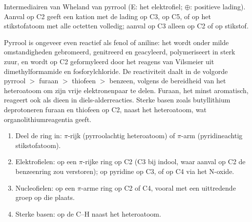 \begin{omfigure}

{\small Intermediairen van Wheland van pyrrool (E: het elektrofiel; $\oplus$: positieve lading).
Aanval op C2 geeft een kation met de lading op C3, op C5, of op het stikstofatoom met alle
octetten volledig; aanval op C3 alleen op C2 of op stikstof.}
\end{omfigure}

Pyrrool is ongeveer even reactief als fenol of aniline: het wordt onder
milde omstandigheden gebromeerd, genitreerd en geacyleerd, polymeriseert
in sterk zuur, en wordt op C2 geformyleerd door het reagens van Vilsmeier
uit dimethylformamide en fosforylchloride. De reactiviteit daalt in de volgorde pyrrool $>$ furaan $>$ thiofeen $>$ benzeen,
volgens de bereidheid van het heteroatoom om zijn vrije elektronenpaar te
delen. Furaan, het minst aromatisch, reageert ook als dieen in
diels-alderreacties. Sterke basen zoals butyllithium deprotoneren furaan
en thiofeen op C2, naast het heteroatoom, wat
organolithiumreagentia geeft.

\begin{method}\label{met:b3:heterocycles:site}
\begin{enumerate}
  \item Deel de ring in: $\pi$-rijk (pyrroolachtig heteroatoom) of $\pi$-arm
        (pyridineachtig stikstofatoom).
  \item Elektrofielen: op een $\pi$-rijke ring op C2 (C3 bij indool, waar aanval op C2
        de benzeenring zou verstoren); op pyridine op C3, of op C4 via het
        N-oxide.
  \item Nucleofielen: op een $\pi$-arme ring op C2 of C4, vooral met een
        uittredende groep op die plaats.
  \item Sterke basen: op de C--H naast het heteroatoom.
\end{enumerate}
\end{method}

